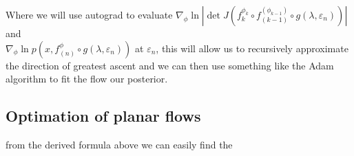 Where we will use autograd to evaluate  $\nabla_\phi \ln|\det J(f^{\phi_k}_k \circ f^{(\phi_{k-1})}_{(k-1)}\circ g(\lambda,\varepsilon_n))|$ and \\  $ \nabla_\phi \ln p(x,f^\phi_{(n)}\circ g(\lambda,\varepsilon_n))$ at $\varepsilon_n$, this will allow us to recursively approximate the direction of greatest ascent and we can then use something like the Adam algorithm to fit the flow our posterior.

\subsection{Optimation of planar flows}
from the derived formula above we can easily find the 